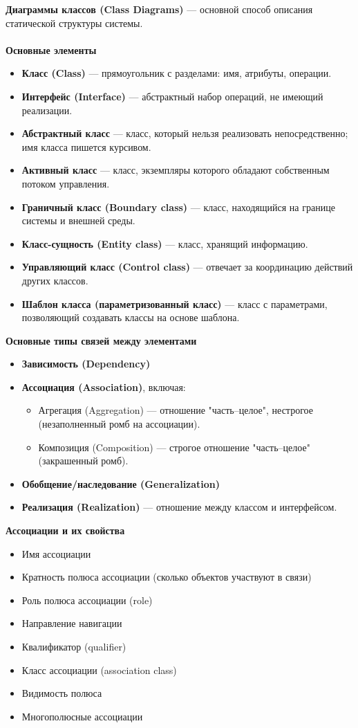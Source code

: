 \documentclass[a4paper, 12pt]{report}
\numberwithin{equation}{section}
\begin{document}
\textbf{Диаграммы классов (Class Diagrams)} — основной способ описания статической структуры системы.
\\\\
\textbf{Основные элементы}
\begin{itemize}
    \item \textbf{Класс (Class)} — прямоугольник с разделами: имя, атрибуты, операции.
    \item \textbf{Интерфейс (Interface)} — абстрактный набор операций, не имеющий реализации.
    \item \textbf{Абстрактный класс} — класс, который нельзя реализовать непосредственно; имя класса пишется курсивом.
    \item \textbf{Активный класс} — класс, экземпляры которого обладают собственным потоком управления.
    \item \textbf{Граничный класс (Boundary class)} — класс, находящийся на границе системы и внешней среды.
    \item \textbf{Класс-сущность (Entity class)} — класс, хранящий информацию.
    \item \textbf{Управляющий класс (Control class)} — отвечает за координацию действий других классов.
    \item \textbf{Шаблон класса (параметризованный класс)} — класс с параметрами, позволяющий создавать классы на основе шаблона.
\end{itemize}
\textbf{Основные типы связей между элементами}
\begin{itemize}
    \item \textbf{Зависимость (Dependency)}
    \item \textbf{Ассоциация (Association)}, включая:
    \begin{itemize}
        \item Агрегация (Aggregation) — отношение "часть–целое", нестрогое (незаполненный ромб на ассоциации).
        \item Композиция (Composition) — строгое отношение "часть–целое" (закрашенный ромб).
    \end{itemize}
    \item \textbf{Обобщение/наследование (Generalization)}
    \item \textbf{Реализация (Realization)} — отношение между классом и интерфейсом.
\end{itemize}
\textbf{Ассоциации и их свойства}
\begin{itemize}
    \item Имя ассоциации
    \item Кратность полюса ассоциации (сколько объектов участвуют в связи)
    \item Роль полюса ассоциации (role)
    \item Направление навигации
    \item Квалификатор (qualifier)
    \item Класс ассоциации (association class)
    \item Видимость полюса
    \item Многополюсные ассоциации
\end{itemize}
\end{document}
